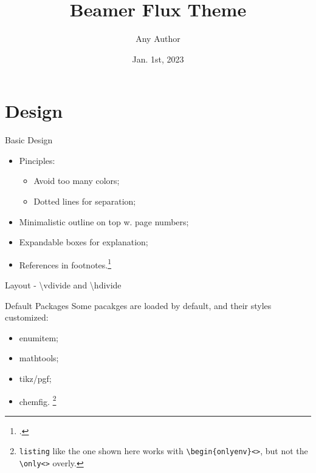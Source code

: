 \documentclass[t]{beamer}
\author{Any Author}
\date{Jan. 1st, 2023}
\title{Beamer Flux Theme}
\institute{Any University}
\begin{document}
\begin{frame}[plain]
    \maketitle
\end{frame}

\section{Design}

\begin{frame}[fragile]{Basic Design}
\begin{itemize}
  \item Pinciples: \begin{itemize}[label={\tiny\faCircleO}]
    \item Avoid too many colors;
    \item Dotted lines for separation;
  \end{itemize}
  \item Minimalistic outline on top w. page numbers;
  \item <2-> Expandable boxes for explanation; 
  \item <3-> References in footnotes.\footcite{1932_OnsagerFuoss}
\end{itemize}
\end{frame}

\begin{frame}{Layout - {\ttfamily\textbackslash{}vdivide} and {\ttfamily\textbackslash{}hdivide}}
\end{frame}

\begin{frame}[fragile]{Default Packages}
Some pacakges are loaded by default, and their styles customized:
\begin{itemize}
    \item enumitem;
    \item mathtools;
    \item tikz/pgf;
    \item chemfig.%
     \footnote{\texttt{listing} like the one shown here works with \texttt{\textbackslash{}begin\{onlyenv\}<>}, but not the \texttt{\textbackslash{}only<>} overly.}%
     \begin{dotlst}[%
      listing side text,righthand ratio=.48,
      title={Chemfig Example: $\mathrm{[BMIM][HOAc]}$}
    ]
    \end{dotlst}
\end{itemize}
\end{frame}
\end{document}
